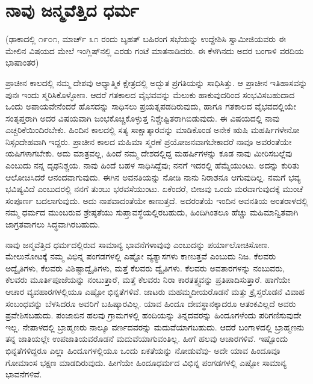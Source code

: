 
\chapter{ನಾವು ಜನ್ಮವೆತ್ತಿದ ಧರ್ಮ}

(ಢಾಕಾದಲ್ಲಿ ೧೯೦೧, ಮಾರ್ಚ್ ೩೧ ರಂದು ಬೃಹತ್​ ಬಹಿರಂಗ ಸಭೆಯನ್ನು ಉದ್ದೇಶಿಸಿ ಸ್ವಾಮೀಜಿಯವರು ಈ ಮೇಲಿನ ವಿಷಯದ ಮೇಲೆ ಇಂಗ್ಲಿಷ್​ನಲ್ಲಿ ಎರಡು ಗಂಟೆ ಮಾತನಾಡಿದರು. ಈ ಕೆಳಗಿನದು ಅದರ ಬಂಗಾಳಿ ವರದಿಯ ಭಾಷಾಂತರ)

ಪ್ರಾಚೀನ ಕಾಲದಲ್ಲಿ ನಮ್ಮ ದೇಶವು ಆಧ್ಯಾತ್ಮಿಕ ಕ್ಷೇತ್ರದಲ್ಲಿ ಅದ್ಭುತ ಪ್ರಗತಿಯನ್ನು ಸಾಧಿಸಿತ್ತು. ಆ ಪ್ರಾಚೀನ ಇತಿಹಾಸವನ್ನು ಪುನಃ ಇಂದು ಸ್ಮರಿಸಿಕೊಳ್ಳೋಣ. ಆದರೆ ಗತಕಾಲದ ವೈಭವವನ್ನು ಮೆಲುಕು ಹಾಕುವುದರಿಂದ ಸಂಭವಿಸಬಹುದಾದ ಒಂದು ಅಪಾಯವೇನೆಂದರೆ ಹೊಸದನ್ನು ಸಾಧಿಸಲು ಪ್ರಯತ್ನಪಡದಿರುವುದು, ಹಾಗೂ ಗತಕಾಲದ ವೈಭವದಲ್ಲಿಯೇ ಸಂತೃಪ್ತರಾಗಿ ಅದರ ವಿಷಯವಾಗಿ ಜಂಭಕೊಚ್ಚಿಕೊಳ್ಳುತ್ತ ನಿಶ್ಚೇಷ್ಟಿತರಾಗಿಬಿಡುವುದು. ಈ ವಿಷಯದಲ್ಲಿ ನಾವು ಎಚ್ಚರಿಕೆಯಿಂದಿರಬೇಕು. ಹಿಂದಿನ ಕಾಲದಲ್ಲಿ ಸತ್ಯ ಸಾಕ್ಷಾತ್ಕಾರವನ್ನು ಮಾಡಿಕೊಂಡ ಅನೇಕ ಋಷಿ ಮಹರ್ಷಿಗಳೇನೋ ನಿಸ್ಸಂದೇಹವಾಗಿ ಇದ್ದರು. ಪ್ರಾಚೀನ ಕಾಲದ ಮಹಿಮಾ ಸ್ಮರಣೆ ಪ್ರಯೋಜನವಾಗಬೇಕಾದರೆ ನಾವೂ ಅವರಂತೆಯೇ ಋಷಿಗಳಾಗಬೇಕು. ಅದು ಮಾತ್ರವಲ್ಲ, ಹಿಂದೆ ನಮ್ಮ ದೇಶದಲ್ಲಿದ್ದ ಮಹರ್ಷಿಗಳನ್ನು ಕೂಡ ನಾವು ಮೀರಿಸಬಲ್ಲೆವು ಎಂಬುದು ನನ್ನ ದೃಢನಿಶ್ಚಯ. ನಾವು ಹಿಂದೆ ಬಹಳ ಸಾಧಿಸಿದ್ದೆವು; ನನಗೆ ಇದರಲ್ಲಿ ಹೆಮ್ಮೆಯುಂಟು. ಅದನ್ನು ಕುರಿತು ಆಲೋಚಿಸಿದರೆ ಆನಂದವಾಗುವುದು. ಈಗಿನ ಅವನತಿಯನ್ನು ನೋಡಿ ನಾನು ನಿರಾಶನೂ ಆಗುವುದಿಲ್ಲ. ನಮಗೆ ಭವ್ಯ ಭವಿಷ್ಯವಿದೆ ಎಂಬುದರಲ್ಲಿ ನನಗೆ ತುಂಬು ಭರವಸೆಯುಂಟು. ಏಕೆಂದರೆ, ಬೀಜವು ಒಂದು ಮರವಾಗುವುದಕ್ಕೆ ಮುಂಚೆ ಸಂಪೂರ್ಣ ಬದಲಾಗುವುದು. ಅದು ನಾಶವಾದಂತೆಯೇ ಕಾಣುತ್ತದೆ. ಅದರಂತೆಯೆ ಇಂದಿನ ಅವನತಿಯ ಅಂತರಾಳದಲ್ಲಿ ನಮ್ಮ ಧರ್ಮದ ಮುಂಬರುವ ಶ್ರೇಷ್ಠತೆಯು ಸುಪ್ತಾವಸ್ಥೆ\-ಯಲ್ಲಿರಬಹುದು, ಹಿಂದಿಗಿಂತಲೂ ಹೆಚ್ಚು ಮಹಿಮಾನ್ವಿತವಾಗಿ ಜಾಗ್ರತವಾಗಲು ಸಿದ್ಧವಾಗಿರಬಹುದು.

ನಾವು ಜನ್ಮವೆತ್ತಿದ ಧರ್ಮದಲ್ಲಿರುವ ಸಾಮಾನ್ಯ ಭಾವನೆಗಳಾವುವು ಎಂಬುದನ್ನು ಪರ್ಯಾಲೋಚಿಸೋಣ. ಮೇಲುನೋಟಕ್ಕೆ ನಮ್ಮ ವಿಭಿನ್ನ ಪಂಗಡಗಳಲ್ಲಿ ಎಷ್ಟೋ ವ್ಯತ್ಯಾಸಗಳು ಕಾಣುತ್ತವೆ ಎಂಬುದು ನಿಜ. ಕೆಲವರು ಅದ್ವೈತಿಗಳು, ಕೆಲವರು ವಿಶಿಷ್ಟಾದ್ವೈತಿಗಳು, ಮತ್ತೆ ಕೆಲವರು ದ್ವೈತಿಗಳು. ಕೆಲವರು ಅವತಾರಗಳನ್ನು ನಂಬುವರು, ಕೆಲವರು ಮೂರ್ತಿಪೂಜೆಯನ್ನು ನಂಬುತ್ತಾರೆ, ಮತ್ತೆ ಕೆಲವರು ನಿರಾ ಕಾರತತ್ತ್ವವನ್ನು ಪ್ರತಿಪಾದಿಸುತ್ತಾರೆ. ಹಾಗೆಯೇ ಆಚಾರ ವ್ಯವಹಾರಗಳಲ್ಲಿಯೂ ಎಷ್ಟೋ ಭಿನ್ನತೆಗಳಿವೆ. ಜಾಟರು ಮಹಮ್ಮದೀಯರೊಡನೆ ಮತ್ತು ಕ್ರೈಸ್ತರೊಡನೆ ವಿವಾಹ ಸಂಬಂಧವನ್ನು ಬೆಳಸಿದರೂ ಅವರಿಗೆ ಬಹಿಷ್ಕಾರವಿಲ್ಲ. ಯಾವ ಹಿಂದೂ ದೇವಸ್ಥಾನಕ್ಕಾದರೂ ಆತಂಕವಿಲ್ಲದೆ ಅವರು ಪ್ರವೇಶಿಸಬಹುದು. ಪಂಜಾಬಿನ ಹಲವು ಗ್ರಾಮಗಳಲ್ಲಿ ಹಂದಿಯನ್ನು ತಿನ್ನದವರನ್ನು ಹಿಂದೂಗಳೆಂದು ಪರಿಗಣಿಸುವುದೇ ಇಲ್ಲ. ನೇಪಾಳದಲ್ಲಿ ಬ್ರಾಹ್ಮಣರು ನಾಲ್ಕೂ ವರ್ಣದವರನ್ನು ಮದುವೆಯಾಗಬಹುದು. ಆದರೆ ಬಂಗಾಳದಲ್ಲಿ ಬ್ರಾಹ್ಮಣನು ತನ್ನ ಜಾತಿಯಲ್ಲೇ ಉಪಜಾತಿಯವರೊಡನೆ ಮದುವೆಯಾಗುವಂತಿಲ್ಲ. ಹೀಗೆ ಹಲವು ಆಚಾರಗಳಿವೆ. ಇಷ್ಟೊಂದು ಭಿನ್ನತೆಗಳಿದ್ದರೂ ಎಲ್ಲಾ ಹಿಂದೂಗಳಲ್ಲಿಯೂ ಒಂದು ಏಕತೆಯನ್ನು ನೋಡುವೆವು- ಅದೇ ಯಾವ ಹಿಂದೂವೂ ಗೋಮಾಂಸ ಭಕ್ಷಣ ಮಾಡದಿರುವುದು. ಹೀಗೆಯೇ ಹಿಂದೂಧರ್ಮದ ವಿಭಿನ್ನ ಪಂಗಡಗಳಲ್ಲಿ ಎಷ್ಟೋ ಸಾಮಾನ್ಯ ಭಾವನೆಗಳಿವೆ.

